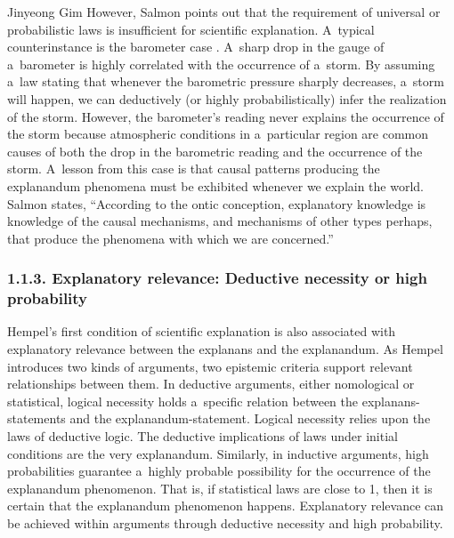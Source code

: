 \begin{artengenv}{Jinyeong Gim}
\enlargethispage{1.5\baselineskip}
However, Salmon points out that the requirement of universal or probabilistic laws is insufficient for scientific explanation. A~typical counterinstance is the barometer case
\parencite[][p.47]{salmon_four_1989}. %
 A~sharp drop in the gauge of a~barometer is highly correlated with the occurrence of a~storm. By assuming a~law stating that whenever the barometric pressure sharply decreases, a~storm will happen, we can deductively (or highly probabilistically) infer the realization of the storm. However, the barometer's reading never explains the occurrence of the storm because atmospheric conditions in a~particular region are common causes of both the drop in the barometric reading and the occurrence of the storm. A~lesson from this case is that causal patterns producing the explanandum phenomena must be exhibited whenever we explain the world. Salmon 
\parencite*[][p.128]{salmon_four_1989} %
 states, ``According to the ontic conception, explanatory knowledge is knowledge of the causal mechanisms, and mechanisms of other types perhaps, that produce the phenomena with which we are concerned.''

\subsubsection{1.1.3. Explanatory relevance: Deductive necessity or high probability}

Hempel's first condition of scientific explanation is also associated with explanatory relevance between the explanans and the explanandum. As Hempel introduces two kinds of arguments, two epistemic criteria support relevant relationships between them. In deductive arguments, either nomological or statistical, logical necessity holds a~specific relation between the explanans-statements and the explanandum-statement. Logical necessity relies upon the laws of deductive logic. The deductive implications of laws under initial conditions are the very explanandum. Similarly, in inductive arguments, high probabilities guarantee a~highly probable possibility for the occurrence of the explanandum phenomenon. That is, if statistical laws are close to 1, then it is certain that the explanandum phenomenon happens. Explanatory relevance can be achieved within arguments through deductive necessity and high probability.


\end{artengenv}
